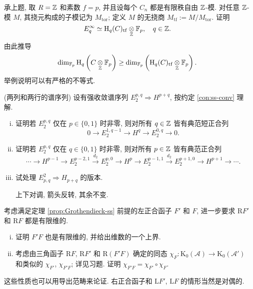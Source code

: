 \begin{Exercises}
	\item 承上题, 取 $R = \mathbb{Z}$ 和素数 $f = p$, 并且设每个 $C_n$ 都是有限秩自由 $\mathbb{Z}$-模. 对任意 $\mathbb{Z}$-模 $M$, 其挠元构成的子模记为 $M_{\mathrm{tor}}$; 定义 $M$ 的无挠商 $M_{\mathrm{tf}} := M/M_{\mathrm{tor}}$. 证明
	\[ E^\infty_q \simeq \operatorname{H}_q(C)_{\mathrm{tf}} \underset{\mathbb{Z}}{\otimes} \mathbb{F}_p , \quad q \in \mathbb{Z}. \]
	由此推导
	\[ \dim_{\mathbb{F}_p} \operatorname{H}_q\left( C \underset{\mathbb{Z}}{\otimes} \mathbb{F}_p\right) \geq \dim_{\mathbb{F}_p} \left( \operatorname{H}_q(C)_{\mathrm{tf}} \underset{\mathbb{Z}}{\otimes} \mathbb{F}_p \right). \]
	举例说明可以有严格的不等式.
	
	\item (两列和两行的谱序列) 设有强收敛谱序列 $E_2^{p, q} \Rightarrow H^{p+q}$, 按约定 \ref{con:ss-conv} 理解.
	\begin{enumerate}[(i)]
		\item 证明若 $E_2^{p,q}$ 仅在 $p \in \{0, 1\}$ 时非零, 则对所有 $q \in \mathbb{Z}$ 皆有典范短正合列
		\[ 0 \to E_2^{1, q-1} \to H^q \to E_2^{0, q} \to 0. \]
		\item 证明若 $E_2^{p,q}$ 仅在 $q \in \{0, 1\}$ 时非零, 则对所有 $p \in \mathbb{Z}$ 皆有典范正合列
		\[ \cdots \to H^{p-1} \to E_2^{p-2, 1} \xrightarrow{d_2} E_2^{p, 0} \to H^p \to E_2^{p-1, 1} \xrightarrow{d_2} E_2^{p+1, 0} \to H^{p+1} \to \cdots. \]
		\item 试处理 $E^2_{p,q} \Rightarrow H_{p+q}$ 的版本.
		\begin{hint}
			上下对调, 箭头反转, 其余不变.
		\end{hint}
	\end{enumerate}

	\item 考虑满足定理 \ref{prop:Grothendieck-ss} 前提的左正合函子 $F'$ 和 $F$, 进一步要求 $\mathrm{R}F'$ 和 $\mathrm{R}F$ 都是有限维的.
	\begin{enumerate}[(i)]
		\item 证明 $F'F$ 也是有限维的, 并给出维数的一个上界.
		\item 考虑由三角函子 $\mathrm{R}F$, $\mathrm{R}F'$ 和 $\mathrm{R}(F'F)$ 确定的同态 $\chi_F: \mathrm{K}_0(\mathcal{A}) \to \mathrm{K}_0(\mathcal{A}')$ 和类似的 $\chi_{F'}$, $\chi_{F'F}$; 详见习题. 证明 $\chi_{F'F} = \chi_{F'} \circ \chi_F$.
	\end{enumerate}
	这些性质也可以用导出范畴来论证. 右正合函子和 $\mathrm{L}F'$, $\mathrm{L}F$ 的情形当然是对偶的.


\end{Exercises}

